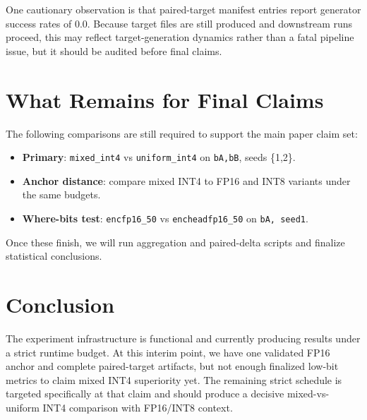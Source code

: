 \documentclass{article}
\begin{document}
One cautionary observation is that paired-target manifest entries report generator success rates of 0.0.
Because target files are still produced and downstream runs proceed, this may reflect target-generation dynamics rather than a fatal pipeline issue, but it should be audited before final claims.

\section{What Remains for Final Claims}
The following comparisons are still required to support the main paper claim set:
\begin{itemize}
  \item \textbf{Primary}: \texttt{mixed\_int4} vs \texttt{uniform\_int4} on \texttt{bA,bB}, seeds \{1,2\}.
  \item \textbf{Anchor distance}: compare mixed INT4 to FP16 and INT8 variants under the same budgets.
  \item \textbf{Where-bits test}: \texttt{encfp16\_50} vs \texttt{encheadfp16\_50} on \texttt{bA, seed1}.
\end{itemize}
Once these finish, we will run aggregation and paired-delta scripts and finalize statistical conclusions.

\section{Conclusion}
The experiment infrastructure is functional and currently producing results under a strict runtime budget.
At this interim point, we have one validated FP16 anchor and complete paired-target artifacts, but not enough finalized low-bit metrics to claim mixed INT4 superiority yet.
The remaining strict schedule is targeted specifically at that claim and should produce a decisive mixed-vs-uniform INT4 comparison with FP16/INT8 context.



\end{document}
